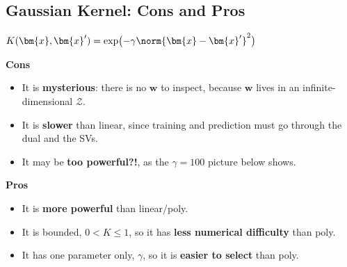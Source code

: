 \subsection{Gaussian Kernel: Cons and Pros}

\begin{center}
    \begin{minipage}[c]{0.4\textwidth}
        \centering
        \ksvmpanel[2.8]{\ksvmGaussA}{\ksvmGaussData}{\ksvmGaussASV}
    \end{minipage}%
    \hfill
    \begin{minipage}[c]{0.5\textwidth}
        \centering
        \(K(\bm{x}, \bm{x}') = \exp\bigl(-\gamma \norm{\bm{x} - \bm{x}'}^2\bigr)\)
    \end{minipage}
\end{center}

\begin{center}
    \begin{minipage}[t]{0.47\textwidth}
        \raggedright\textbf{Cons}
        \begin{itemize}
            \item It is \textbf{mysterious}: there is no \(\bm{w}\) to
                inspect, because \(\bm{w}\) lives in an infinite-dimensional
                \(\mathcal{Z}\).
            \item It is \textbf{slower} than linear, since training and
                prediction must go through the dual and the SVs.
            \item It may be \textbf{too powerful?!}, as the \(\gamma = 100\)
                picture below shows.
        \end{itemize}
        \centering
        \ksvmpanel[2.4]{\ksvmGaussC}{\ksvmGaussData}{\ksvmGaussCSV}
    \end{minipage}%
    \hfill
    \begin{minipage}[t]{0.47\textwidth}
        \raggedright\textbf{Pros}
        \begin{itemize}
            \item It is \textbf{more powerful} than linear/poly.
            \item It is bounded, \(0 < K \le 1\), so it has \textbf{less
                numerical difficulty} than poly.
            \item It has one parameter only, \(\gamma\), so it is
                \textbf{easier to select} than poly.
        \end{itemize}
    \end{minipage}
\end{center}

